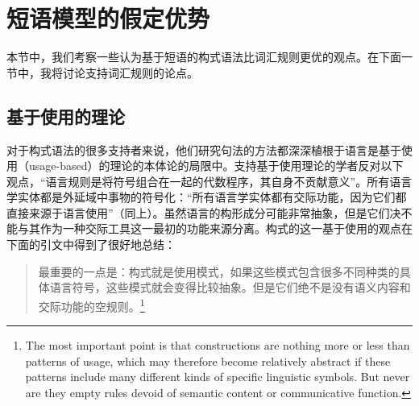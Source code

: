\section{短语模型的假定优势}
\label{Abschnitt-Stoepselei}
%

    本节中，我们考察一些认为基于短语的构式语法比词汇规则更优的观点。在下面一节中，我将讨论支持词汇规则的论点。

\subsection{基于使用的理论}\label{usage-based-sec}
    对于构式语法的很多支持者来说，他们研究句法的方法都深深植根于语言是基于使用（usage-based）的理论\citep{Langacker87a-u, Goldberg95a,Croft2001a, Tomasello2003a}的本体论的局限中。支持基于使用理论的学者反对以下观点，“语言规则是将符号组合在一起的代数程序，其自身不贡献意义”\citep[]{Tomasello2003a}。所有语言学实体都是外延域中事物的符号化：“所有语言学实体都有交际功能，因为它们都直接来源于语言使用”（同上）。虽然语言的构形成分可能非常抽象，但是它们决不能与其作为一种交际工具这一最初的功能来源分离。构式的这一基于使用的观点在下面的引文中得到了很好地总结：
\begin{quotation}
最重要的一点是：构式就是使用模式，如果这些模式包含很多不同种类的具体语言符号，这些模式就会变得比较抽象。但是它们绝不是没有语义内容和交际功能的空规则。\citep[]{Tomasello2003a}\footnote{%
The most important point is that constructions are nothing more or less than patterns of usage,
which may therefore become relatively abstract if these patterns include many different kinds of
specific linguistic symbols.  But never are they empty rules devoid of semantic content or
communicative function.
}
\end{quotation}

